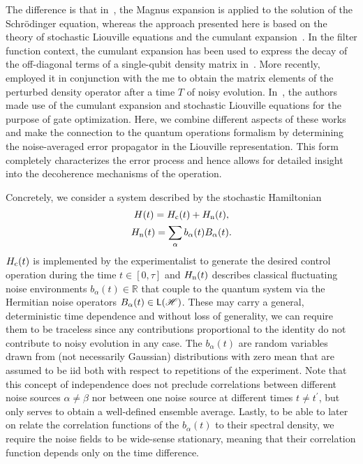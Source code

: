 The difference is that in~, the Magnus expansion is applied to the solution of the Schrödinger equation, whereas the approach presented here is based on the theory of stochastic Liouville equations and the cumulant expansion~\cite{Kubo1962,Kubo1963}.
In the filter function context, the cumulant expansion has been used to express the decay of the off-diagonal terms of a single-qubit density matrix in~.
More recently,~\textcite{Paz-Silva2014} employed it in conjunction with the \gls{me} to obtain the matrix elements of the perturbed density operator after a time $T$ of noisy evolution.
In~, the authors made use of the cumulant expansion and stochastic Liouville equations for the purpose of gate optimization.
Here, we combine different aspects of these works and make the connection to the quantum operations formalism by determining the noise-averaged error propagator in the Liouville representation.
This form completely characterizes the error process and hence allows for detailed insight into the decoherence mechanisms of the operation.

Concretely, we consider a system described by the stochastic Hamiltonian
\begin{gather}
    H(t) = H_{\mathrm{c}}(t) + H_{\mathrm{n}}(t),\label{eq:ff:hamiltonian} \\
    H_{\mathrm{n}}(t) = \sum_\alpha b_\alpha(t) B_\alpha(t). \label{eq:ff:hamiltonian:noise}
\end{gather}
$H_{\mathrm{c}}(t)$ is implemented by the experimentalist to generate the desired control operation during the time $t\in [0, \tau]$ and $H_{\mathrm{n}}(t)$ describes classical fluctuating noise environments $b_\alpha(t)\in\mathbb{R}$ that couple to the quantum system via the Hermitian noise operators $B_\alpha(t)\in\mathsf{L}(\mathscr{H})$.
These may carry a general, deterministic time dependence and without loss of generality, we can require them to be traceless since any contributions proportional to the identity do not contribute to noisy evolution in any case.
The $b_\alpha(t)$ are random variables drawn from (not necessarily Gaussian) distributions with zero mean that are assumed to be \acrshort{iid} both with respect to repetitions of the experiment.
Note that this concept of independence does not preclude correlations between different noise sources $\alpha\neq\beta$ nor between one noise source at different times $t\neq t^\prime$, but only serves to obtain a well-defined ensemble average.
Lastly, to be able to later on relate the correlation functions of the $b_\alpha(t)$ to their spectral density, we require the noise fields to be wide-sense stationary, meaning that their correlation function depends only on the time difference.

